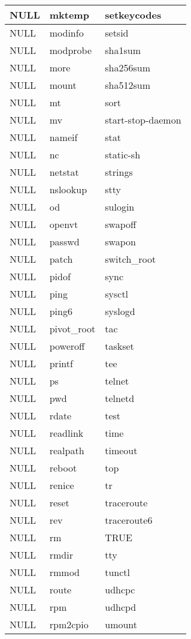 \begin{longtable}{llp{64mm}}
NULL & mktemp & setkeycodes \\ \hline
NULL & modinfo & setsid \\ \hline
NULL & modprobe & sha1sum \\ \hline
NULL & more & sha256sum \\ \hline
NULL & mount & sha512sum \\ \hline
NULL & mt & sort \\ \hline
NULL & mv & start-stop-daemon \\ \hline
NULL & nameif & stat \\ \hline
NULL & nc & static-sh \\ \hline
NULL & netstat & strings \\ \hline
NULL & nslookup & stty \\ \hline
NULL & od & sulogin \\ \hline
NULL & openvt & swapoff \\ \hline
NULL & passwd & swapon \\ \hline
NULL & patch & switch_root \\ \hline
NULL & pidof & sync \\ \hline
NULL & ping & sysctl \\ \hline
NULL & ping6 & syslogd \\ \hline
NULL & pivot_root & tac \\ \hline
NULL & poweroff & taskset \\ \hline
NULL & printf & tee \\ \hline
NULL & ps & telnet \\ \hline
NULL & pwd & telnetd \\ \hline
NULL & rdate & test \\ \hline
NULL & readlink & time \\ \hline
NULL & realpath & timeout \\ \hline
NULL & reboot & top \\ \hline
NULL & renice & tr \\ \hline
NULL & reset & traceroute \\ \hline
NULL & rev & traceroute6 \\ \hline
NULL & rm & TRUE \\ \hline
NULL & rmdir & tty \\ \hline
NULL & rmmod & tunctl \\ \hline
NULL & route & udhcpc \\ \hline
NULL & rpm & udhcpd \\ \hline
NULL & rpm2cpio & umount \\ \hline

\end{longtable}
